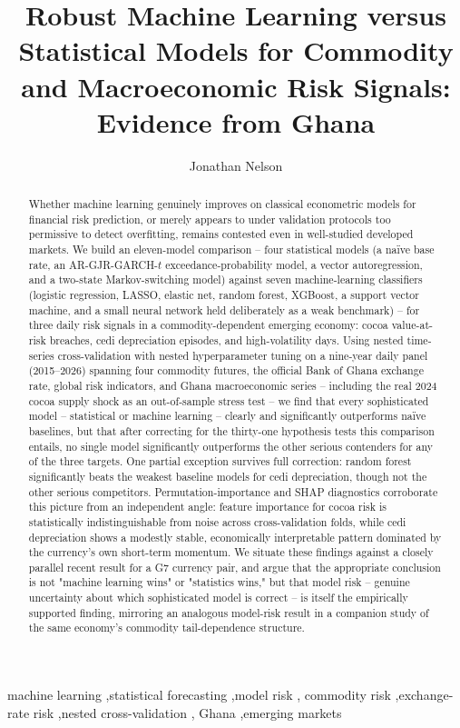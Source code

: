 \documentclass[final,3p,times,authoryear]{elsarticle}
\begin{document}
\begin{frontmatter}

\title{Robust Machine Learning versus Statistical Models for Commodity
and Macroeconomic Risk Signals: Evidence from Ghana}

\author{Jonathan Nelson}
\address{Independent Research Project}

\begin{abstract}
Whether machine learning genuinely improves on classical econometric
models for financial risk prediction, or merely appears to under
validation protocols too permissive to detect overfitting, remains
contested even in well-studied developed markets. We build an
eleven-model comparison -- four statistical models (a na\"ive base rate,
an AR-GJR-GARCH-$t$ exceedance-probability model, a vector
autoregression, and a two-state Markov-switching model) against seven
machine-learning classifiers (logistic regression, LASSO, elastic net,
random forest, XGBoost, a support vector machine, and a small neural
network held deliberately as a weak benchmark) -- for three daily risk
signals in a commodity-dependent emerging economy: cocoa value-at-risk
breaches, cedi depreciation episodes, and high-volatility days. Using
nested time-series cross-validation with nested hyperparameter
tuning on a nine-year daily panel (2015--2026) spanning four commodity
futures, the official Bank of Ghana exchange rate, global risk
indicators, and Ghana macroeconomic series -- including the real 2024
cocoa supply shock as an out-of-sample stress test -- we find that every sophisticated model -- statistical or machine
learning -- clearly and significantly outperforms na\"ive baselines, but
that after correcting for the thirty-one hypothesis tests this
comparison entails, no single model significantly outperforms the other
serious contenders for any of the three targets. One partial exception
survives full correction: random forest significantly beats the
weakest baseline models for cedi depreciation, though not the other
serious competitors. Permutation-importance and SHAP diagnostics
corroborate this picture from an independent angle: feature importance
for cocoa risk is statistically indistinguishable from noise across
cross-validation folds, while cedi depreciation shows a modestly stable,
economically interpretable pattern dominated by the currency's own
short-term momentum. We situate these findings against a closely
parallel recent result for a G7 currency pair, and argue that the
appropriate conclusion is not "machine learning wins" or "statistics
wins," but that model risk -- genuine uncertainty about which
sophisticated model is correct -- is itself the empirically supported
finding, mirroring an analogous model-risk result in a companion study
of the same economy's commodity tail-dependence structure.
\end{abstract}

\begin{keyword}
machine learning \sep statistical forecasting \sep model risk \sep
commodity risk \sep exchange-rate risk \sep nested cross-validation \sep
Ghana \sep emerging markets
\end{keyword}

\end{frontmatter}
\end{document}
